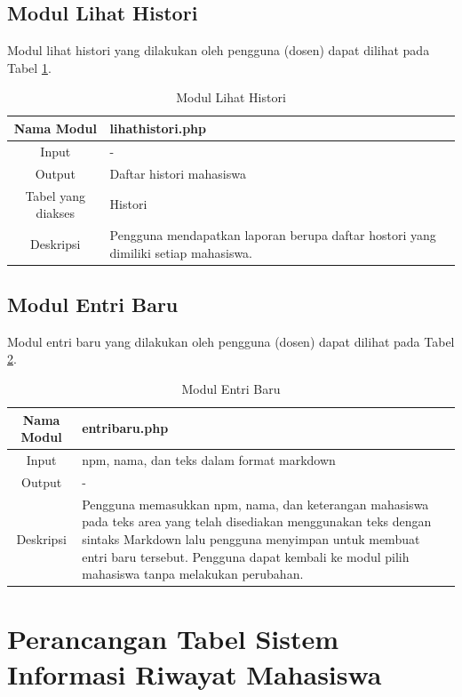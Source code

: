 \subsection{Modul Lihat Histori}
Modul lihat histori yang dilakukan oleh pengguna (dosen) dapat dilihat pada
Tabel \ref{tab:modullihathistori}.

\begin{table}[h]
\centering
\caption[Tabel Modul Lihat Histori]{Modul Lihat Histori}
\label{tab:modullihathistori}
\begin{tabular}{|c|p{7cm}|}
\hline
Nama Modul & lihathistori.php\\
\hline
Input & -\\
\hline
Output & Daftar histori mahasiswa\\
\hline
Tabel yang diakses & Histori\\
\hline
Deskripsi & Pengguna mendapatkan laporan berupa daftar hostori yang dimiliki
setiap mahasiswa.\\
\hline
\end{tabular}
\end{table}

\subsection{Modul Entri Baru}
Modul entri baru yang dilakukan oleh pengguna (dosen) dapat dilihat pada Tabel
\ref{tab:modulentribaru}.

\begin{table}[h]
\centering
\caption[Tabel Modul Entri Baru]{Modul Entri Baru} 
\label{tab:modulentribaru}
\begin{tabular}{|c|p{7cm}|}
\hline
Nama Modul & entribaru.php\\
\hline
Input & npm, nama, dan teks dalam format markdown\\
\hline
Output & -\\
\hline
\hline
Deskripsi & Pengguna memasukkan npm, nama, dan keterangan mahasiswa pada teks
area yang telah disediakan menggunakan teks dengan sintaks Markdown lalu
pengguna menyimpan untuk membuat entri baru tersebut. Pengguna dapat kembali ke
modul pilih mahasiswa tanpa melakukan perubahan.\\
\hline
\end{tabular}
\end{table}

\section{Perancangan Tabel Sistem Informasi Riwayat Mahasiswa}
\label{sec:perancangantabel}

